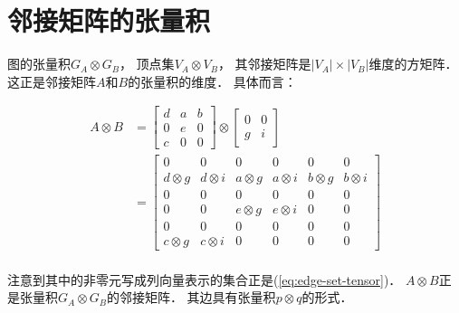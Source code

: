 \documentclass[10pt, openany]{book}
\begin{document}
\section{邻接矩阵的张量积}

图的张量积$G_A \otimes G_B$，
顶点集$V_A \otimes V_B$，
其邻接矩阵是$|V_A| \times |V_B|$维度的方矩阵．
这正是邻接矩阵$A$和$B$的张量积的维度．
具体而言：

\begin{equation}
\begin{aligned}
A \otimes B &=
\begin{bmatrix}
d & a & b \\
0 & e & 0 \\
c & 0 & 0
\end{bmatrix}
\otimes
\begin{bmatrix}
0 & 0 \\
g & i
\end{bmatrix}    \\
&=\left[ \begin{array}{cc|cc|cc}
0 & 0 & 0 & 0 & 0 & 0 \\
d \otimes g & d \otimes i & a \otimes g & a \otimes i & b \otimes g & b \otimes i \\
\hline
0 & 0 & 0 & 0 & 0 & 0 \\
0 & 0 & e \otimes g & e \otimes i & 0 & 0 \\
\hline
0 & 0 & 0 & 0 & 0 & 0 \\
c \otimes g & c \otimes i & 0 & 0 & 0 & 0
\end{array} \right] \\
\end{aligned}
\end{equation}

注意到其中的非零元写成列向量表示的集合正是(\ref{eq:edge-set-tensor})．
$A \otimes B$正是张量积$G_A \otimes G_B$的邻接矩阵．
其边具有张量积$p\otimes q$的形式．
\end{document}

